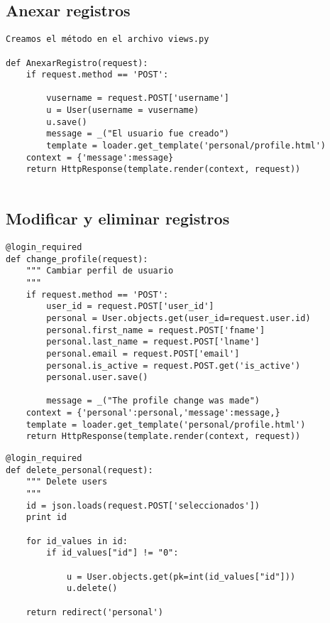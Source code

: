 \documentclass[xcolor=dvipsnames]{beamer}
\begin{document}
\subsection{Anexar registros}
\begin{frame}[fragile]
\begin{verbatim}
Creamos el método en el archivo views.py

def AnexarRegistro(request):
    if request.method == 'POST':
        
        vusername = request.POST['username']
        u = User(username = vusername)
        u.save()
        message = _("El usuario fue creado")
        template = loader.get_template('personal/profile.html')
    context = {'message':message}
    return HttpResponse(template.render(context, request))
       
\end{verbatim}
\end{frame}

\subsection{Modificar y eliminar registros}
\begin{frame}[fragile]
\begin{verbatim}
@login_required
def change_profile(request):
    """ Cambiar perfil de usuario
    """
    if request.method == 'POST':
        user_id = request.POST['user_id']
        personal = User.objects.get(user_id=request.user.id)               
        personal.first_name = request.POST['fname']
        personal.last_name = request.POST['lname']
        personal.email = request.POST['email']
        personal.is_active = request.POST.get('is_active')
        personal.user.save()
        
        message = _("The profile change was made")
	context = {'personal':personal,'message':message,}
    template = loader.get_template('personal/profile.html')
    return HttpResponse(template.render(context, request))

\end{verbatim}
\end{frame}

\begin{frame}[fragile]
\begin{verbatim}
@login_required
def delete_personal(request):
    """ Delete users 
    """
    id = json.loads(request.POST['seleccionados'])
    print id 
 
    for id_values in id:
        if id_values["id"] != "0":
	           
            u = User.objects.get(pk=int(id_values["id"]))
            u.delete()   
	   
    return redirect('personal')
\end{verbatim}
\end{frame}
\end{document}
